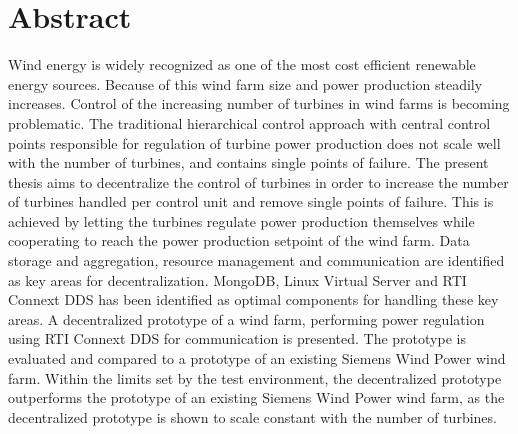\chapter{Abstract}
Wind energy is widely recognized as one of the most cost efficient renewable energy sources. 
Because of this wind farm size and power production steadily increases.
Control of the increasing number of turbines in wind farms is becoming problematic.
%
The traditional hierarchical control approach with central control points responsible for regulation of turbine power production does not scale well with the number of turbines, and contains single points of failure.
%
The present thesis aims to decentralize the control of turbines in order to increase the number of turbines handled per control unit and remove single points of failure. 
%
This is achieved by letting the turbines regulate power production themselves while cooperating to reach the power production setpoint of the wind farm. Data storage and aggregation, resource management and communication are identified as key areas for decentralization.
MongoDB, Linux Virtual Server and RTI Connext DDS has been identified as optimal components for handling these key areas. 
A decentralized prototype of a wind farm, performing power regulation using RTI Connext DDS for communication is presented.
The prototype is evaluated and compared to a prototype of an existing Siemens Wind Power wind farm. Within the limits set by the test environment, the decentralized prototype outperforms the prototype of an existing Siemens Wind Power wind farm, as the decentralized prototype is shown to scale constant with the number of turbines.

